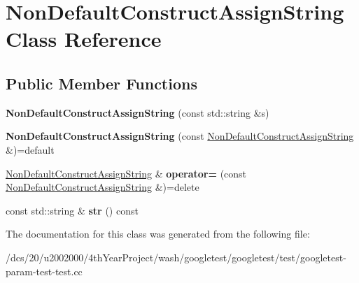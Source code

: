 \hypertarget{classNonDefaultConstructAssignString}{}\section{Non\+Default\+Construct\+Assign\+String Class Reference}
\label{classNonDefaultConstructAssignString}
\subsection*{Public Member Functions}
\begin{DoxyCompactItemize}
\item 
\mbox{\label{classNonDefaultConstructAssignString_a85e34ec502250fb18edd56a86353d20d}} 
{\bfseries Non\+Default\+Construct\+Assign\+String} (const std\+::string \&s)
\item 
\mbox{\label{classNonDefaultConstructAssignString_a4451f36916583a96f3b64b0ddeef6792}} 
{\bfseries Non\+Default\+Construct\+Assign\+String} (const \mbox{\hyperlink{classNonDefaultConstructAssignString}{Non\+Default\+Construct\+Assign\+String}} \&)=default
\item 
\mbox{\label{classNonDefaultConstructAssignString_ab88ed6416c7e274d033bf181ce889f9b}} 
\mbox{\hyperlink{classNonDefaultConstructAssignString}{Non\+Default\+Construct\+Assign\+String}} \& {\bfseries operator=} (const \mbox{\hyperlink{classNonDefaultConstructAssignString}{Non\+Default\+Construct\+Assign\+String}} \&)=delete
\item 
\mbox{\label{classNonDefaultConstructAssignString_a7b428e839204101cb3b7f5b14a66688c}} 
const std\+::string \& {\bfseries str} () const
\end{DoxyCompactItemize}


The documentation for this class was generated from the following file\+:\begin{DoxyCompactItemize}
\item 
/dcs/20/u2002000/4th\+Year\+Project/wash/googletest/googletest/test/googletest-\/param-\/test-\/test.\+cc\end{DoxyCompactItemize}
